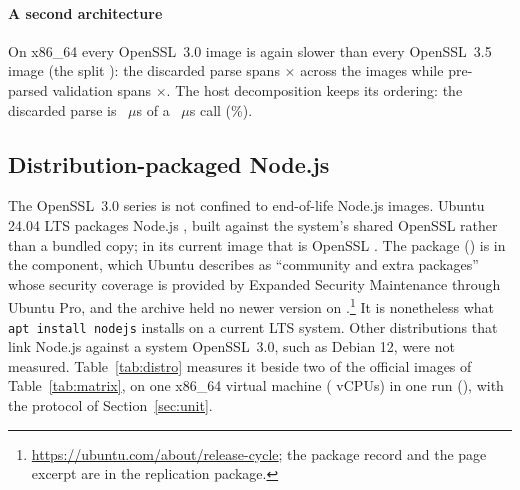 \documentclass[preprint,12pt,authoryear]{elsarticle}
\begin{document}
\paragraph{A second architecture}\label{sec:rq2-arch} On x86\_64 every
OpenSSL~3.0 image is again slower than every OpenSSL~3.5 image (the split
\XmSeriesSplitHolds): the discarded parse spans \XmSpanProbeThrows$\times$ across
the images while pre-parsed validation spans \XmSpanJwtPreparsed$\times$. The
host decomposition keeps its ordering: the discarded parse is
\XhProbeThrows~$\mu$s of a \XhJwtString~$\mu$s call (\XhProbeShareOfCall\%).

\subsection{Distribution-packaged Node.js}\label{sec:distro}

The OpenSSL~3.0 series is not confined to end-of-life Node.js images. Ubuntu
24.04 LTS packages Node.js \DistroUbuntuNode{}, built against the system's
shared OpenSSL rather than a bundled copy; in its current image that is OpenSSL
\DistroUbuntuOpenssl. The package (\texttt{\UbuntuNodejsPkg}) is in the
\emph{\UbuntuNodejsComponent} component, which Ubuntu describes as
``community and extra packages'' whose security coverage is provided by
Expanded Security Maintenance through Ubuntu Pro, and the archive held no newer
version on
\UbuntuNodejsCaptured.\footnote{\url{https://ubuntu.com/about/release-cycle};
the package record and the page excerpt are in the replication package.} It is
nonetheless what \texttt{apt install nodejs} installs on a current LTS system.
Other distributions that link Node.js against a system OpenSSL~3.0, such as
Debian 12, were not measured.
Table~\ref{tab:distro} measures it beside two of the
official images of Table~\ref{tab:matrix}, on one x86\_64 virtual machine
(\DistroCpus{} vCPUs) in one run (\DistroCaptured), with the protocol of
Section~\ref{sec:unit}.
\end{document}
